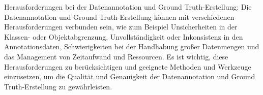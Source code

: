 Herausforderungen bei der Datenannotation und Ground Truth-Erstellung: Die
Datenannotation und Ground Truth-Erstellung können mit verschiedenen
Herausforderungen verbunden sein, wie zum Beispiel Unsicherheiten in der
Klassen- oder Objektabgrenzung, Unvollständigkeit oder Inkonsistenz in den
Annotationsdaten, Schwierigkeiten bei der Handhabung großer Datenmengen und das
Management von Zeitaufwand und Ressourcen. Es ist wichtig, diese
Herausforderungen zu berücksichtigen und geeignete Methoden und Werkzeuge
einzusetzen, um die Qualität und Genauigkeit der Datenannotation und Ground
Truth-Erstellung zu gewährleisten.